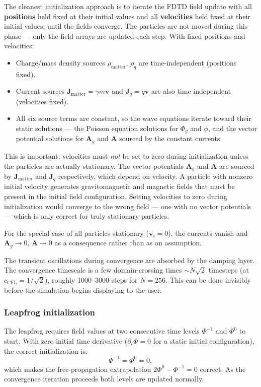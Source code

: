 \documentclass[11pt,a4paper]{article}
\newcommand{\vv}[1]{\mathbf{#1}}
\newcommand{\Phig}{\Phi_g}
\newcommand{\Ag}{\vv{A}_g}
\begin{document}
The cleanest initialization approach is to iterate the FDTD field update with all \textbf{positions} held fixed at their initial values and all \textbf{velocities} held fixed at their initial values, until the fields converge.  The particles are not moved during this phase --- only the field arrays are updated each step.  With fixed positions and velocities:
\begin{itemize}
  \item Charge/mass density sources $\rho_{\mathrm{matter}}$, $\rho_q$ are time-independent (positions fixed).
  \item Current sources $\vv{J}_{\mathrm{matter}} = \gamma m\vv{v}$ and $\vv{J}_q = q\vv{v}$ are also time-independent (velocities fixed).
  \item All six source terms are constant, so the wave equations iterate toward their static solutions --- the Poisson equation solutions for $\Phig$ and $\phi$, and the vector potential solutions for $\Ag$ and $\vv{A}$ sourced by the constant currents.
\end{itemize}
This is important: velocities must \emph{not} be set to zero during initialization unless the particles are actually stationary.  The vector potentials $\Ag$ and $\vv{A}$ are sourced by $\vv{J}_{\mathrm{matter}}$ and $\vv{J}_q$ respectively, which depend on velocity.  A particle with nonzero initial velocity generates gravitomagnetic and magnetic fields that must be present in the initial field configuration.  Setting velocities to zero during initialization would converge to the wrong field --- one with no vector potentials --- which is only correct for truly stationary particles.

For the special case of all particles stationary ($\vv{v}_i = 0$), the currents vanish and $\Ag \to 0$, $\vv{A} \to 0$ as a consequence rather than as an assumption.

The transient oscillations during convergence are absorbed by the damping layer.  The convergence timescale is a few domain-crossing times $\sim N\sqrt{2}$ timesteps (at $c_{\mathrm{CFL}} = 1/\sqrt{2}$), roughly 1000--3000 steps for $N=256$.  This can be done invisibly before the simulation begins displaying to the user.

\subsubsection*{Leapfrog initialization}

The leapfrog requires field values at two consecutive time levels $\Phi^{-1}$ and $\Phi^0$ to start.  With zero initial time derivative ($\partial_t\Phi = 0$ for a static initial configuration), the correct initialization is:
\begin{equation}
  \Phi^{-1} = \Phi^0 = 0,
\end{equation}
which makes the free-propagation extrapolation $2\Phi^0 - \Phi^{-1} = 0$ correct.  As the convergence iteration proceeds both levels are updated normally.
\end{document}
